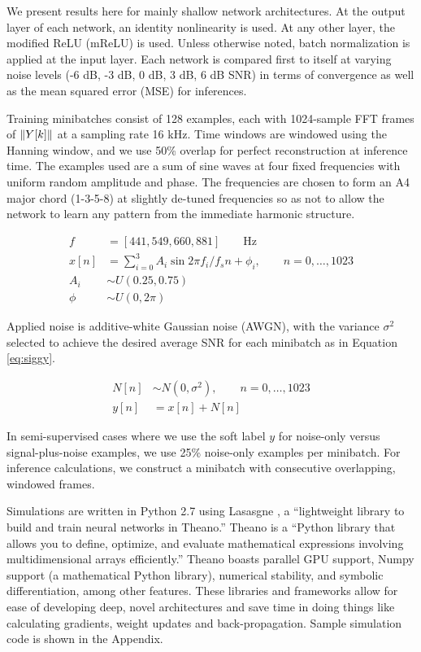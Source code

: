 We present results here for mainly shallow network architectures. At the output layer of each network, an identity nonlinearity is used. At any other layer, the modified ReLU (mReLU) is used. Unless otherwise noted, batch normalization is applied at the input layer. Each network is compared first to itself at varying noise levels (-6 dB, -3 dB, 0 dB, 3 dB, 6 dB SNR) in terms of convergence as well as the mean squared error (MSE) for inferences.

Training minibatches consist of 128 examples, each with 1024-sample FFT frames of $\lVert Y[k]\rVert$ at a sampling rate 16 kHz. Time windows are windowed using the Hanning window, and we use 50\% overlap for perfect reconstruction at inference time. The examples used are a sum of sine waves at four fixed frequencies with uniform random amplitude and phase. The frequencies are chosen to form an A4 major chord (1-3-5-8) at slightly de-tuned frequencies so as not to allow the network to learn any pattern from the immediate harmonic structure.

\begin{align}
f &= [441, 549, 660, 881]\qquad \text{Hz}\\
x[n] &= \sum_{i=0}^{3} A_i \sin{2 \pi f_i / f_s n + \phi_i}, \qquad n=0,\ldots ,1023\\
A_i &\sim U(0.25, 0.75)\\
\phi &\sim U(0, 2\pi)
\end{align}

Applied noise is additive-white Gaussian noise (AWGN), with the variance $\sigma^2$ selected to achieve the desired average SNR for each minibatch as in Equation \ref{eq:siggy}.

\begin{align}
N[n] &\sim N(0, \sigma^2), \qquad n=0,	\ldots ,1023\\
y[n] &= x[n] + N[n]
\end{align}

In semi-supervised cases where we use the soft label $y$ for noise-only versus signal-plus-noise examples, we use 25\% noise-only examples per minibatch. For inference calculations, we construct a minibatch with consecutive overlapping, windowed frames.

Simulations are written in Python 2.7 using Lasasgne \cite{sander_dieleman_2015_27878}, a ``lightweight library to build and train neural networks in Theano.'' Theano is a ``Python library that allows you to define, optimize, and evaluate mathematical expressions involving multidimensional arrays efficiently.'' \cite{2016arXiv160502688short} Theano boasts parallel GPU support, Numpy support (a mathematical Python library), numerical stability, and symbolic differentiation, among other features. These libraries and frameworks allow for ease of developing deep, novel architectures and save time in doing things like calculating gradients, weight updates and back-propagation. Sample simulation code is shown in the Appendix.

